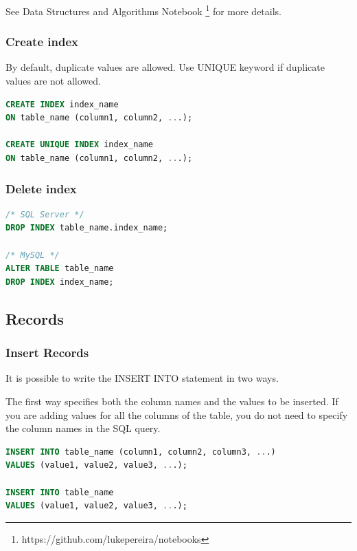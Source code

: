 \documentclass{article}
\begin{document}
See Data Structures and Algorithms Notebook \footnote{https://github.com/lukepereira/notebooks} for more details. 

\subsubsection{Create index}
By default, duplicate values are allowed. Use UNIQUE keyword if duplicate values are not allowed.

\vspace{8pt} \begin{lstlisting}[language=SQL]
CREATE INDEX index_name
ON table_name (column1, column2, ...);

CREATE UNIQUE INDEX index_name
ON table_name (column1, column2, ...);
\end{lstlisting} \vspace{8pt}

\subsubsection{Delete index}

\vspace{8pt} \begin{lstlisting}[language=SQL]
/* SQL Server */
DROP INDEX table_name.index_name;

/* MySQL */
ALTER TABLE table_name
DROP INDEX index_name;
\end{lstlisting} \vspace{8pt}

\subsection{Records}

\subsubsection{Insert Records}
It is possible to write the INSERT INTO statement in two ways.

The first way specifies both the column names and the values to be inserted. If you are adding values for all the columns of the table, you do not need to specify the column names in the SQL query.

\vspace{8pt} \begin{lstlisting}[language=SQL]
INSERT INTO table_name (column1, column2, column3, ...)
VALUES (value1, value2, value3, ...);

INSERT INTO table_name
VALUES (value1, value2, value3, ...);
\end{lstlisting} \vspace{8pt}
\end{document}
